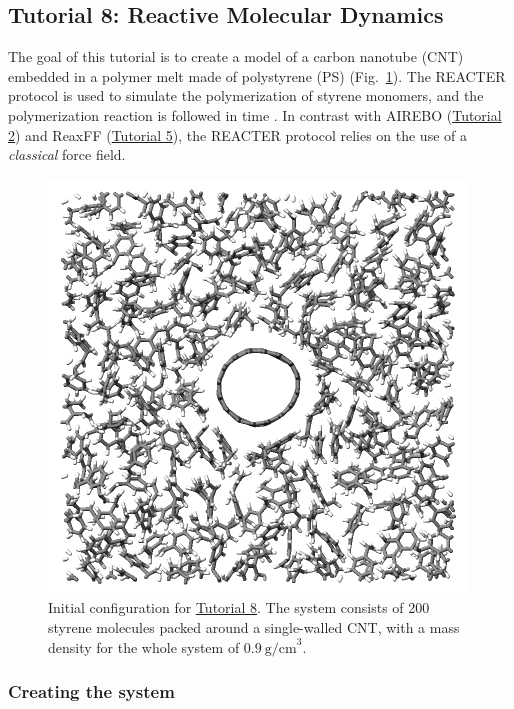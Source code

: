 \documentclass[9pt,tutorial]{livecoms}
\begin{document}
\subsection{Tutorial 8: Reactive Molecular Dynamics}
\label{bond-react-label}

The goal of this tutorial is to create a model of a carbon nanotube (CNT) embedded
in a polymer melt made of polystyrene (PS) (Fig.~\ref{fig:REACT}).  The
REACTER protocol is used to simulate the polymerization of styrene monomers, and the
polymerization reaction is followed in time \cite{gissinger2017polymer, gissinger2020reacter, gissinger2024molecular}.
In contrast with AIREBO (\hyperref[carbon-nanotube-label]{Tutorial 2})
and ReaxFF (\hyperref[reactive-silicon-dioxide-label]{Tutorial 5}), the REACTER
protocol relies on the use of a \textit{classical} force field.

\begin{figure}
\centering
\includegraphics[width=0.7\linewidth]{REACT.png}
\caption{Initial configuration for \hyperref[bond-react-label]{Tutorial 8}.
The system consists of 200 styrene molecules packed around a single-walled
CNT, with a mass density for the whole system of $0.9~\text{g/cm}^3$.}
\label{fig:REACT}
\end{figure}

\subsubsection{Creating the system}
\end{document}
